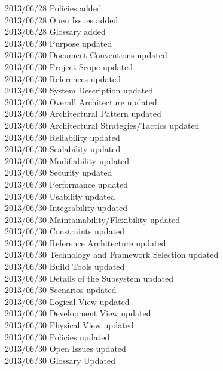 \documentclass[29pt,a4paper]{moderncv}
\begin{document}
\begin{tabbing}
2013/06/28  \> Policies added\\
2013/06/28  \> Open Issues added\\
2013/06/28  \> Glossary added\\
2013/06/30  \> Purpose updated\\
2013/06/30  \> Document Conventions updated\\
2013/06/30  \> Project Scope updated\\
2013/06/30  \> References updated\\
2013/06/30  \> System Description updated\\
2013/06/30  \> Overall Architecture updated\\
2013/06/30  \> Architectural Pattern updated\\	
2013/06/30  \> Architectural Strategies/Tactics updated\\
2013/06/30  \> Reliability updated\\
2013/06/30  \> Scalability updated\\
2013/06/30  \> Modifiability updated\\
2013/06/30  \> Security updated\\
2013/06/30  \> Performance updated\\
2013/06/30  \> Usability updated\\
2013/06/30  \> Integrability updated\\
2013/06/30  \> Maintainability/Flexibility updated\\
2013/06/30  \> Constraints updated\\
2013/06/30  \> Reference Architecture updated\\
2013/06/30  \> Technology and Framework Selection updated\\
2013/06/30  \> Build Tools updated\\
2013/06/30  \> Details of the Subsystem updated\\
2013/06/30  \> Scenarios updated\\
2013/06/30  \> Logical View updated\\
2013/06/30  \> Development View updated\\
2013/06/30  \> Physical View updated\\
2013/06/30  \> Policies updated\\
2013/06/30  \> Open Issues updated\\
2013/06/30  \> Glossary Updated\\

\end{tabbing}
\end{document}
